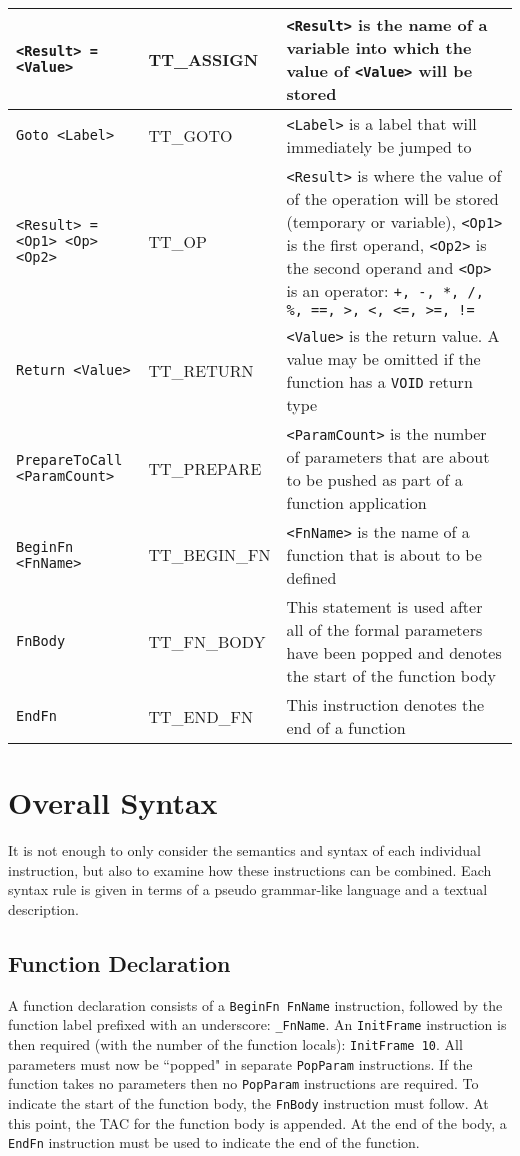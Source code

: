 \begin{longtable}{|p{5.5cm}|p{3.5cm}|p{7cm}|}
	\verb!<Result> = <Value>! & TT\_ASSIGN & \verb!<Result>! is the name of a variable into which the value of \verb!<Value>! will be stored\\ \hline
	\verb!Goto <Label>! & TT\_GOTO & \verb!<Label>! is a label that will immediately be jumped to\\ \hline
	\verb!<Result> = <Op1> <Op> <Op2>! & TT\_OP & \verb!<Result>! is where the value of of the operation will be stored (temporary or variable), \verb!<Op1>! is the first operand, \verb!<Op2>! is the second operand and \verb!<Op>! is an operator: \verb`+, -, *, /, %, ==, >, <, <=, >=, !=`\\ \hline
	\verb!Return <Value>! & TT\_RETURN & \verb!<Value>! is the return value. A value may be omitted if the function has a \verb!VOID! return type\\ \hline
	\verb!PrepareToCall <ParamCount>! & TT\_PREPARE & \verb!<ParamCount>! is the number of parameters that are about to be pushed as part of a function application\\ \hline
	\verb!BeginFn <FnName>! & TT\_BEGIN\_FN & \verb!<FnName>! is the name of a function that is about to be defined\\ \hline	
	\verb!FnBody! & TT\_FN\_BODY & This statement is used after all of the formal parameters have been popped and denotes the start of the function body\\ \hline
	\verb!EndFn! & TT\_END\_FN & This instruction denotes the end of a function\\ \hline	
\end{longtable}

\section{Overall Syntax}

It is not enough to only consider the semantics and syntax of each individual instruction, but also to examine how these instructions can be combined. Each syntax rule is given in terms of a pseudo grammar-like language and a textual description.

\subsection{Function Declaration}
A function declaration consists of a \verb!BeginFn FnName! instruction, followed by the function label prefixed with an underscore: \verb!_FnName!. An \verb!InitFrame! instruction is then required (with the number of the function locals): \verb!InitFrame 10!. All parameters must now be ``popped" in separate \verb!PopParam! instructions. If the function takes no parameters then no \verb!PopParam! instructions are required. To indicate the start of the function body, the \verb!FnBody! instruction must follow. At this point, the TAC for the function body is appended. At the end of the body, a \verb!EndFn! instruction must be used to indicate the end of the function.

